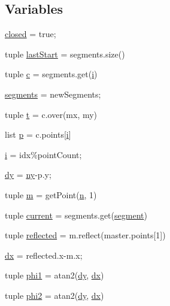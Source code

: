 \subsection*{Variables}
\begin{DoxyCompactItemize}
\item 
\hyperlink{namespacebezier_a9df8c553fbf62057af742910a55bda90}{closed} = true;
\item 
tuple \hyperlink{namespacebezier_ad3e176f900e0e892b1621ab09241ca08}{last\+Start} = segments.\+size()
\item 
tuple \hyperlink{namespacebezier_acdfb18e445ac8e833eda8fb411fe7373}{c} = segments.\+get(\hyperlink{namespacebezier_a928e2d96e49d7898d0f47903caf0f866}{i})
\item 
\hyperlink{namespacebezier_af5dc7bac630ffee9827391cfaac1e06b}{segments} = new\+Segments;
\item 
tuple \hyperlink{namespacebezier_a21309dd6a23cee0f4b3888de7b66b7ff}{t} = c.\+over(mx, my)
\item 
list \hyperlink{namespacebezier_adfc12e63653920e367a9c81631c20a52}{p} = c.\+points\mbox{[}\hyperlink{namespacebezier_a928e2d96e49d7898d0f47903caf0f866}{i}\mbox{]}
\item 
\hyperlink{namespacebezier_a928e2d96e49d7898d0f47903caf0f866}{i} = idx\%point\+Count;
\item 
\hyperlink{namespacebezier_a119a2ba91f8e406351b32bb87ab3f461}{dy} = \hyperlink{namespacebezier_ac63543ece85dc0cb795314fa0ad3f11c}{ny}-\/p.\+y;
\item 
tuple \hyperlink{namespacebezier_a7a011a9ac17e30960f8474441f256e6c}{m} = get\+Point(\hyperlink{namespacebezier_a6af7fcd36e64d55245071a38cffbae33}{n}, 1)
\item 
tuple \hyperlink{namespacebezier_afea563cafd3cc59f5602af082de31682}{current} = segments.\+get(\hyperlink{namespacebezier_ae4beec9a717adf1c578294a19edbca65}{segment})
\item 
tuple \hyperlink{namespacebezier_a73a62826780aabf596dcf302d422c619}{reflected} = m.\+reflect(master.\+points\mbox{[}1\mbox{]})
\item 
\hyperlink{namespacebezier_a9c15e0bd907e89888a94c1abad682558}{dx} = reflected.\+x-\/m.\+x;
\item 
tuple \hyperlink{namespacebezier_a071d613d4d6e142ebebd01d0201eb7e8}{phi1} = atan2(\hyperlink{namespacebezier_a119a2ba91f8e406351b32bb87ab3f461}{dy}, \hyperlink{namespacebezier_a9c15e0bd907e89888a94c1abad682558}{dx})
\item 
tuple \hyperlink{namespacebezier_ac56c7cbbcdf67f6322e12351b2187cb1}{phi2} = atan2(\hyperlink{namespacebezier_a119a2ba91f8e406351b32bb87ab3f461}{dy}, \hyperlink{namespacebezier_a9c15e0bd907e89888a94c1abad682558}{dx})

\end{DoxyCompactItemize}
